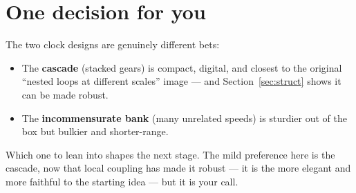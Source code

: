 \documentclass[11pt]{article}
\begin{document}
\section{One decision for you}

The two clock designs are genuinely different bets:

\begin{itemize}
\item The \textbf{cascade} (stacked gears) is compact, digital, and closest to the
original ``nested loops at different scales'' image --- and Section~\ref{sec:struct}
shows it can be made robust.
\item The \textbf{incommensurate bank} (many unrelated speeds) is sturdier out of the
box but bulkier and shorter-range.
\end{itemize}

Which one to lean into shapes the next stage. The mild preference here is the cascade,
now that local coupling has made it robust --- it is the more elegant and more
faithful to the starting idea --- but it is your call.
\end{document}
